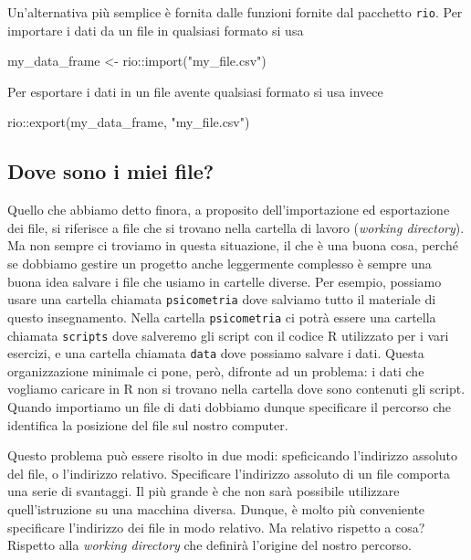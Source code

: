 \documentclass[
  11pt,
]{krantz}
\makeatletter
\newenvironment{Shaded}{\begin{snugshade}}{\end{snugshade}}
\newcommand{\FunctionTok}[1]{\textcolor[rgb]{0,0,0}{#1}}
\newcommand{\NormalTok}[1]{#1}
\newcommand{\OtherTok}[1]{\textcolor[rgb]{0.37,0.37,0.37}{#1}}
\newcommand{\SpecialCharTok}[1]{\textcolor[rgb]{0,0,0}{#1}}
\newcommand{\StringTok}[1]{\textcolor[rgb]{0.5,0.5,0.5}{#1}}
\newenvironment{kframe}{%
\medskip{}
\setlength{\fboxsep}{.8em}
 \def\at@end@of@kframe{}%
 \ifinner\ifhmode%
  \def\at@end@of@kframe{\end{minipage}}%
  \begin{minipage}{\columnwidth}%
 \fi\fi%
 \def\FrameCommand##1{\hskip\@totalleftmargin \hskip-\fboxsep
 \colorbox{shadecolor}{##1}\hskip-\fboxsep
     \hskip-\linewidth \hskip-\@totalleftmargin \hskip\columnwidth}%
 \MakeFramed {\advance\hsize-\width
   \@totalleftmargin\z@ \linewidth\hsize
   \@setminipage}}%
 {\par\unskip\endMakeFramed%
 \at@end@of@kframe}
\renewenvironment{Shaded}{\begin{kframe}}{\end{kframe}}
\theoremstyle{definition}
\theoremstyle{definition}
\theoremstyle{definition}
\theoremstyle{definition}
\theoremstyle{remark}
\makeatother
\begin{document}
Un'alternativa più semplice è fornita dalle funzioni fornite dal pacchetto \texttt{rio}. Per importare i dati da un file in qualsiasi formato si usa

\begin{Shaded}
\begin{Highlighting}[]
\NormalTok{my\_data\_frame }\OtherTok{\textless{}{-}}\NormalTok{ rio}\SpecialCharTok{::}\FunctionTok{import}\NormalTok{(}\StringTok{"my\_file.csv"}\NormalTok{)}
\end{Highlighting}
\end{Shaded}

Per esportare i dati in un file avente qualsiasi formato si usa invece

\begin{Shaded}
\begin{Highlighting}[]
\NormalTok{rio}\SpecialCharTok{::}\FunctionTok{export}\NormalTok{(my\_data\_frame, }\StringTok{"my\_file.csv"}\NormalTok{)}
\end{Highlighting}
\end{Shaded}

\hypertarget{dove-sono-i-miei-file}{%
\subsection{Dove sono i miei file?}\label{dove-sono-i-miei-file}}

Quello che abbiamo detto finora, a proposito dell'importazione ed esportazione dei file, si riferisce a file che si trovano nella cartella di lavoro (\emph{working directory}). Ma non sempre ci troviamo in questa situazione, il che è una buona cosa, perché se dobbiamo gestire un progetto anche leggermente complesso è sempre una buona idea salvare i file che usiamo in cartelle diverse. Per esempio, possiamo usare una cartella chiamata \texttt{psicometria} dove salviamo tutto il materiale di questo insegnamento. Nella cartella \texttt{psicometria} ci potrà essere una cartella chiamata \texttt{scripts} dove salveremo gli script con il codice R utilizzato per i vari esercizi, e una cartella chiamata \texttt{data} dove possiamo salvare i dati. Questa organizzazione minimale ci pone, però, difronte ad un problema: i dati che vogliamo caricare in R non si trovano nella cartella dove sono contenuti gli script. Quando importiamo un file di dati dobbiamo dunque specificare il percorso che identifica la posizione del file sul nostro computer.

Questo problema può essere risolto in due modi: speficicando l'indirizzo assoluto del file, o l'indirizzo relativo. Specificare l'indirizzo assoluto di un file comporta una serie di svantaggi. Il più grande è che non sarà possibile utilizzare quell'istruzione su una macchina diversa. Dunque, è molto più conveniente specificare l'indirizzo dei file in modo relativo. Ma relativo rispetto a cosa? Rispetto alla \emph{working directory} che definirà l'origine del nostro percorso.
\end{document}
